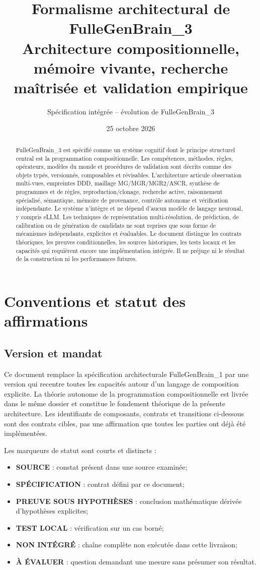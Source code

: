 \documentclass[11pt,a4paper]{article}
\title{Formalisme architectural de FulleGenBrain\_3\\
\large Architecture compositionnelle, mémoire vivante, recherche maîtrisée et validation empirique}
\author{Spécification intégrée -- évolution de FulleGenBrain\_3}
\date{25 octobre 2026}
\newcommand{\Role}[1]{\textbf{#1}}
\begin{document}
\maketitle
\begin{abstract}
FulleGenBrain\_3 est spécifié comme un système cognitif dont le principe structurel central est la programmation compositionnelle. Les compétences, méthodes, règles, opérateurs, modèles du monde et procédures de validation sont décrits comme des objets typés, versionnés, composables et révisables. L'architecture articule observation multi-vues, empreintes DDD, maillage MG/MGR/MGR2/ASCR, synthèse de programmes et de règles, reproduction/clonage, recherche active, raisonnement spécialisé, sémantique, mémoire de provenance, contrôle autonome et vérification indépendante. Le système n'intègre et ne dépend d'aucun modèle de langage neuronal, y compris eLLM. Les techniques de représentation multi-résolution, de prédiction, de calibration ou de génération de candidats ne sont reprises que sous forme de mécanismes indépendants, explicites et évaluables. Le document distingue les contrats théoriques, les preuves conditionnelles, les sources historiques, les tests locaux et les capacités qui requièrent encore une implémentation intégrée. Il ne préjuge ni le résultat de la construction ni les performances futures.
\end{abstract}
\newpage\setcounter{tocdepth}{1}\tableofcontents\newpage

\section{Conventions et statut des affirmations}
\subsection{Version et mandat}
Ce document remplace la spécification architecturale FulleGenBrain\_1 par une version qui recentre toutes les capacités autour d'un langage de composition explicite. La théorie autonome de la programmation compositionnelle est livrée dans le même dossier et constitue le fondement théorique de la présente architecture. Les identifiants de composants, contrats et transitions ci-dessous sont des contrats cibles, pas une affirmation que toutes les parties ont déjà été implémentées.

Les marqueurs de statut sont courts et distincts :
\begin{itemize}
\item \Role{SOURCE} : constat présent dans une source examinée;
\item \Role{SPÉCIFICATION} : contrat défini par ce document;
\item \Role{PREUVE SOUS HYPOTHÈSES} : conclusion mathématique dérivée d'hypothèses explicites;
\item \Role{TEST LOCAL} : vérification sur un cas borné;
\item \Role{NON INTÉGRÉ} : chaîne complète non exécutée dans cette livraison;
\item \Role{À ÉVALUER} : question demandant une mesure sans présumer son résultat.
\end{itemize}
\end{document}
